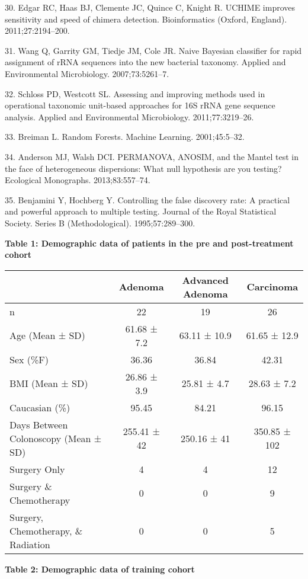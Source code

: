 \documentclass[12pt,]{article}
\begin{document}
\hypertarget{ref-edgar_uchime_2011}{}
30. Edgar RC, Haas BJ, Clemente JC, Quince C, Knight R. UCHIME improves
sensitivity and speed of chimera detection. Bioinformatics (Oxford,
England). 2011;27:2194--200.

\hypertarget{ref-wang_naive_2007}{}
31. Wang Q, Garrity GM, Tiedje JM, Cole JR. Naive Bayesian classifier
for rapid assignment of rRNA sequences into the new bacterial taxonomy.
Applied and Environmental Microbiology. 2007;73:5261--7.

\hypertarget{ref-schloss_assessing_2011}{}
32. Schloss PD, Westcott SL. Assessing and improving methods used in
operational taxonomic unit-based approaches for 16S rRNA gene sequence
analysis. Applied and Environmental Microbiology. 2011;77:3219--26.

\hypertarget{ref-breiman_random_2001}{}
33. Breiman L. Random Forests. Machine Learning. 2001;45:5--32.

\hypertarget{ref-anderson_permanova_2013}{}
34. Anderson MJ, Walsh DCI. PERMANOVA, ANOSIM, and the Mantel test in
the face of heterogeneous dispersions: What null hypothesis are you
testing? Ecological Monographs. 2013;83:557--74.

\hypertarget{ref-benjamini_controlling_1995}{}
35. Benjamini Y, Hochberg Y. Controlling the false discovery rate: A
practical and powerful approach to multiple testing. Journal of the
Royal Statistical Society. Series B (Methodological). 1995;57:289--300.

\newpage

\textbf{Table 1: Demographic data of patients in the pre and
post-treatment cohort}

\begin{longtable}[]{@{}lccc@{}}
\toprule
& Adenoma & Advanced Adenoma & Carcinoma\tabularnewline
\midrule
\endhead
n & 22 & 19 & 26\tabularnewline
Age (Mean ± SD) & 61.68 ± 7.2 & 63.11 ± 10.9 & 61.65 ±
12.9\tabularnewline
Sex (\%F) & 36.36 & 36.84 & 42.31\tabularnewline
BMI (Mean ± SD) & 26.86 ± 3.9 & 25.81 ± 4.7 & 28.63 ± 7.2\tabularnewline
Caucasian (\%) & 95.45 & 84.21 & 96.15\tabularnewline
Days Between Colonoscopy (Mean ± SD) & 255.41 ± 42 & 250.16 ± 41 &
350.85 ± 102\tabularnewline
Surgery Only & 4 & 4 & 12\tabularnewline
Surgery \& Chemotherapy & 0 & 0 & 9\tabularnewline
Surgery, Chemotherapy, \& Radiation & 0 & 0 & 5\tabularnewline
\bottomrule
\end{longtable}

\newpage

\textbf{Table 2: Demographic data of training cohort}
\end{document}
